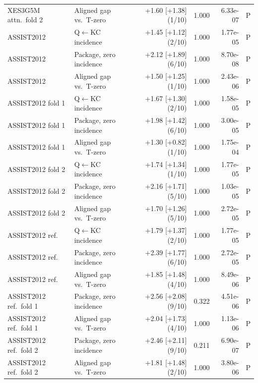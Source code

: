 \begin{table}[tbp]
\begin{tabular}{@{}llrrrr@{}}
XES3G5M attn.\ fold 2 & Aligned gap vs.\ T-zero & +1.60 [+1.38] (1/10) & 1.000 & 6.33e-07 & P \\
ASSIST2012 & Q$\leftarrow$KC incidence & +1.45 [+1.12] (2/10) & 1.000 & 1.77e-05 & P \\
ASSIST2012 & Package, zero incidence & +2.12 [+1.89] (6/10) & 1.000 & 8.70e-08 & P \\
ASSIST2012 & Aligned gap vs.\ T-zero & +1.50 [+1.25] (1/10) & 1.000 & 2.43e-06 & P \\
ASSIST2012 fold 1 & Q$\leftarrow$KC incidence & +1.67 [+1.30] (2/10) & 1.000 & 1.58e-05 & P \\
ASSIST2012 fold 1 & Package, zero incidence & +1.98 [+1.42] (6/10) & 1.000 & 3.00e-05 & P \\
ASSIST2012 fold 1 & Aligned gap vs.\ T-zero & +1.30 [+0.82] (1/10) & 1.000 & 1.75e-04 & P \\
ASSIST2012 fold 2 & Q$\leftarrow$KC incidence & +1.74 [+1.34] (1/10) & 1.000 & 1.77e-05 & P \\
ASSIST2012 fold 2 & Package, zero incidence & +2.16 [+1.71] (5/10) & 1.000 & 1.03e-05 & P \\
ASSIST2012 fold 2 & Aligned gap vs.\ T-zero & +1.70 [+1.26] (5/10) & 1.000 & 2.72e-05 & P \\
ASSIST2012 ref. & Q$\leftarrow$KC incidence & +1.79 [+1.37] (2/10) & 1.000 & 1.77e-05 & P \\
ASSIST2012 ref. & Package, zero incidence & +2.39 [+1.77] (6/10) & 1.000 & 2.72e-05 & P \\
ASSIST2012 ref. & Aligned gap vs.\ T-zero & +1.85 [+1.48] (4/10) & 1.000 & 8.49e-06 & P \\
ASSIST2012 ref.\ fold 1 & Package, zero incidence & +2.56 [+2.08] (9/10) & 0.322 & 4.51e-06 & P \\
ASSIST2012 ref.\ fold 1 & Aligned gap vs.\ T-zero & +2.04 [+1.73] (4/10) & 1.000 & 1.13e-06 & P \\
ASSIST2012 ref.\ fold 2 & Package, zero incidence & +2.46 [+2.11] (9/10) & 0.211 & 6.90e-07 & P \\
ASSIST2012 ref.\ fold 2 & Aligned gap vs.\ T-zero & +1.81 [+1.48] (2/10) & 1.000 & 3.80e-06 & P \\
\bottomrule
\end{tabular}
\end{table}
